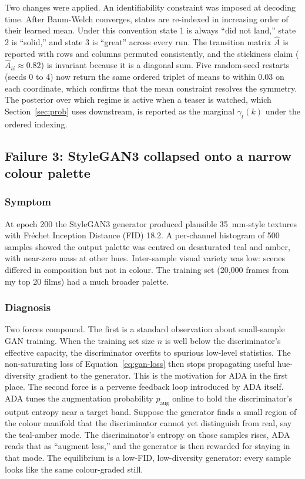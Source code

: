 \documentclass{article}
\begin{document}
Two changes were applied. An identifiability constraint was imposed at decoding time. After Baum-Welch converges, states are re-indexed in increasing order of their learned mean. Under this convention state 1 is always ``did not land,'' state 2 is ``solid,'' and state 3 is ``great'' across every run. The transition matrix $\hat{A}$ is reported with rows and columns permuted consistently, and the stickiness claim ($\hat{A}_{ii} \approx 0.82$) is invariant because it is a diagonal sum. Five random-seed restarts (seeds 0 to 4) now return the same ordered triplet of means to within 0.03 on each coordinate, which confirms that the mean constraint resolves the symmetry. The posterior over which regime is active when a teaser is watched, which Section~\ref{sec:prob} uses downstream, is reported as the marginal $\gamma_t(k)$ under the ordered indexing.

\subsection{Failure 3: StyleGAN3 collapsed onto a narrow colour palette}

\subsubsection*{Symptom}

At epoch 200 the StyleGAN3 generator produced plausible 35~mm-style textures with Fr\'echet Inception Distance (FID) 18.2. A per-channel histogram of 500 samples showed the output palette was centred on desaturated teal and amber, with near-zero mass at other hues. Inter-sample visual variety was low: scenes differed in composition but not in colour. The training set (20{,}000 frames from my top 20 films) had a much broader palette.

\subsubsection*{Diagnosis}

Two forces compound. The first is a standard observation about small-sample GAN training. When the training set size $n$ is well below the discriminator's effective capacity, the discriminator overfits to spurious low-level statistics. The non-saturating loss of Equation~\ref{eq:gan-loss} then stops propagating useful hue-diversity gradient to the generator. This is the motivation for ADA in the first place. The second force is a perverse feedback loop introduced by ADA itself. ADA tunes the augmentation probability $p_\text{aug}$ online to hold the discriminator's output entropy near a target band. Suppose the generator finds a small region of the colour manifold that the discriminator cannot yet distinguish from real, say the teal-amber mode. The discriminator's entropy on those samples rises, ADA reads that as ``augment less,'' and the generator is then rewarded for staying in that mode. The equilibrium is a low-FID, low-diversity generator: every sample looks like the same colour-graded still.
\end{document}

